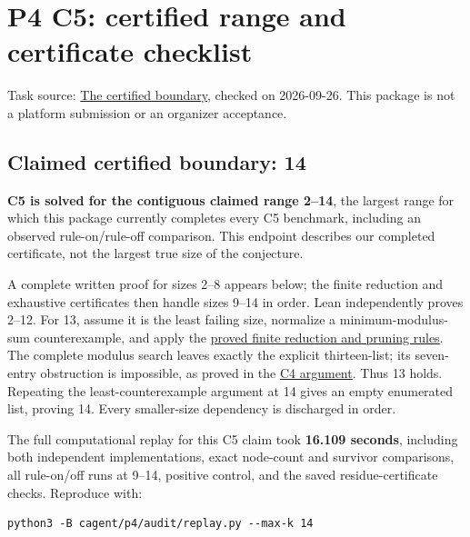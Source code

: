 \documentclass[11pt,a4paper]{article}
\begin{document}
\section{P4 C5: certified range and certificate checklist}\label{p4-c5-certified-range-and-certificate-checklist}

Task source: \href{https://hackathon.bainsa.ai/p/p4/c5}{The certified boundary}, checked on 2026-09-26. This package is not a platform submission or an organizer acceptance.

\subsection{Claimed certified boundary: 14}\label{claimed-certified-boundary-14}

\textbf{C5 is solved for the contiguous claimed range 2--14}, the largest range for which this package currently completes every C5 benchmark, including an observed rule-on/rule-off comparison. This endpoint describes our completed certificate, not the largest true size of the conjecture.

A complete written proof for sizes 2--8 appears below; the finite reduction and exhaustive certificates then handle sizes 9--14 in order. Lean independently proves 2--12. For 13, assume it is the least failing size, normalize a minimum-modulus-sum counterexample, and apply the \href{https://github.com/mpelteshki/climbing-to-the-frontier/blob/ed55f76eb8c558825bb629fd2cd8dbf46e5f1314/cagent/p4/audit/reduction-proof.md}{proved finite reduction and pruning rules}. The complete modulus search leaves exactly the explicit thirteen-list; its seven-entry obstruction is impossible, as proved in the \href{https://github.com/mpelteshki/climbing-to-the-frontier/blob/ed55f76eb8c558825bb629fd2cd8dbf46e5f1314/cagent/p4/c4/solution.md}{C4 argument}. Thus 13 holds. Repeating the least-counterexample argument at 14 gives an empty enumerated list, proving 14. Every smaller-size dependency is discharged in order.

The full computational replay for this C5 claim took \textbf{16.109 seconds}, including both independent implementations, exact node-count and survivor comparisons, all rule-on/off runs at 9--14, positive control, and the saved residue-certificate checks. Reproduce with:

\begin{Verbatim}[breaklines,breakanywhere,fontsize=\footnotesize]
python3 -B cagent/p4/audit/replay.py --max-k 14
\end{Verbatim}
\end{document}

